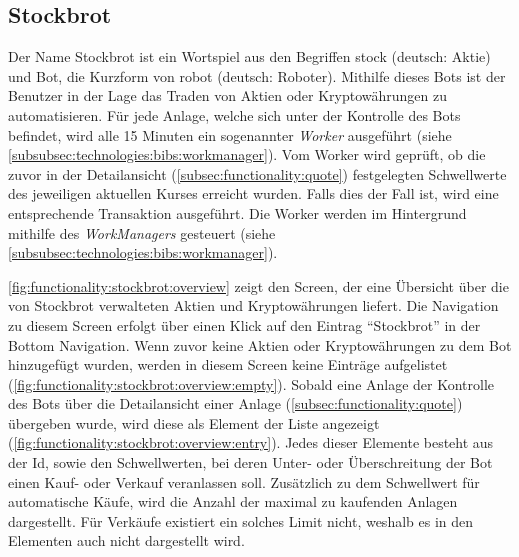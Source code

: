 \documentclass[a4paper]{article}
\begin{document}
\subsection{Stockbrot}
\label{subsec:functionality:stockbrot}
Der Name Stockbrot ist ein Wortspiel aus den Begriffen stock (deutsch: Aktie) und Bot, die Kurzform von robot (deutsch: Roboter). Mithilfe dieses Bots ist der Benutzer in der Lage das Traden von Aktien oder Kryptowährungen zu automatisieren. Für jede Anlage, welche sich unter der Kontrolle des Bots befindet, wird alle 15 Minuten ein sogenannter \textit{Worker} ausgeführt (siehe \autoref{subsubsec:technologies:bibs:workmanager}). Vom Worker wird geprüft, ob die zuvor in der Detailansicht (\autoref{subsec:functionality:quote}) festgelegten Schwellwerte des jeweiligen aktuellen Kurses erreicht wurden. Falls dies der Fall ist, wird eine entsprechende Transaktion ausgeführt. Die Worker werden im Hintergrund mithilfe des \textit{WorkManagers} gesteuert (siehe \autoref{subsubsec:technologies:bibs:workmanager}).

\autoref{fig:functionality:stockbrot:overview} zeigt den Screen, der eine Übersicht über die von Stockbrot verwalteten Aktien und Kryptowährungen liefert. Die Navigation zu diesem Screen erfolgt über einen Klick auf den Eintrag "`Stockbrot"' in der Bottom Navigation. Wenn zuvor keine Aktien oder Kryptowährungen zu dem Bot hinzugefügt wurden, werden in diesem Screen keine Einträge aufgelistet (\autoref{fig:functionality:stockbrot:overview:empty}). Sobald eine Anlage der Kontrolle des Bots über die Detailansicht einer Anlage (\autoref{subsec:functionality:quote}) übergeben wurde, wird diese als Element der Liste angezeigt (\autoref{fig:functionality:stockbrot:overview:entry}). Jedes dieser Elemente besteht aus der Id, sowie den Schwellwerten, bei deren Unter- oder Überschreitung der Bot einen Kauf- oder Verkauf veranlassen soll. Zusätzlich zu dem Schwellwert für automatische Käufe, wird die Anzahl der maximal zu kaufenden Anlagen dargestellt. Für Verkäufe existiert ein solches Limit nicht, weshalb es in den Elementen auch nicht dargestellt wird.
\end{document}
